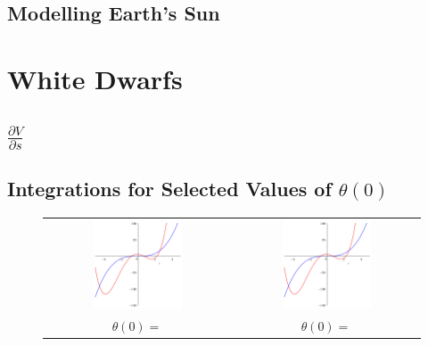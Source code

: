 \documentclass[11pt]{article} %
\newcommand{\pder}[2][]{\frac{\partial#1}{\partial#2}}
\begin{document}
\subsection*{Modelling Earth's Sun}

\section{White Dwarfs}
\subsection*{$\pder[V]{s}$}
\subsection*{Integrations for Selected Values of $\theta(0)$}
\begin{figure}
\begin{tabular}{c c}
  \includegraphics[width=0.5\textwidth]{problem1plot2.png} &   \includegraphics[width=0.5\textwidth]{problem1plot2.png} \\
$\theta(0) = $ & $\theta(0) = $ \\[6pt]

\end{tabular}
\end{figure}
\end{document}
